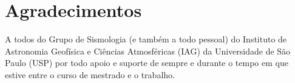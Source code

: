 \documentclass[12pt,twoside,a4paper]{book}
\begin{document}
%
%
%
%
% 
% 
% 
% 
% 
%     
%       



\chapter*{Agradecimentos}
A todos do Grupo de Sismologia (e também a todo pessoal) do Instituto de
Astronomia Geofísica e Ciências Atmosféricas (IAG) da Universidade de São Paulo (USP) 
por todo apoio e suporte de sempre e durante o tempo em que
estive entre o curso de mestrado e o trabalho.
\end{document}

